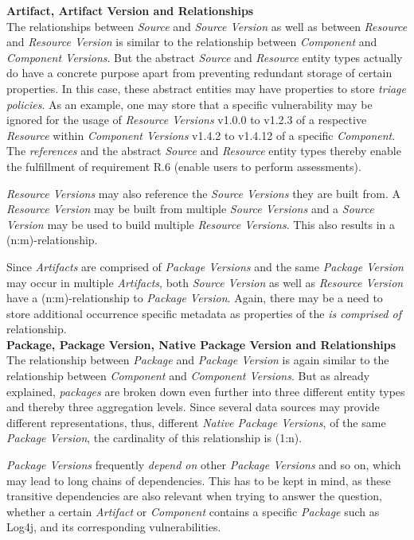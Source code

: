 \noindent\textbf{Artifact, Artifact Version and Relationships}\\
The relationships between \emph{Source} and \emph{Source Version} as well as between \emph{Resource} and \emph{Resource Version} is similar to the relationship between \emph{Component} and \emph{Component Versions}. But the abstract \emph{Source} and \emph{Resource} entity types actually do have a concrete purpose apart from preventing redundant storage of certain properties. In this case, these abstract entities may have properties to store \emph{triage policies}. As an example, one may store that a specific vulnerability may be ignored for the usage of \emph{Resource Versions} v1.0.0 to v1.2.3 of a respective \emph{Resource} within \emph{Component Versions} v1.4.2 to v1.4.12 of a specific \emph{Component}. The \emph{references} and the abstract \emph{Source} and \emph{Resource} entity types thereby enable the fulfillment of requirement R.6 (enable users to perform assessments).\par 
\emph{Resource Versions} may also reference the \emph{Source Versions} they are built from. A \emph{Resource Version} may be built from multiple \emph{Source Versions} and a \emph{Source Version} may be used to build multiple \emph{Resource Versions}. This also results in a (n:m)-relationship.\par
Since \emph{Artifacts} are comprised of \emph{Package Versions} and the same \emph{Package Version} may occur in multiple \emph{Artifacts}, both \emph{Source Version} as well as \emph{Resource Version} have a (n:m)-relationship to \emph{Package Version}. Again, there may be a need to store additional occurrence specific metadata as properties of the \emph{is comprised of} relationship.\\

\noindent\textbf{Package, Package Version, Native Package Version and Relationships}\\
The relationship between \emph{Package} and \emph{Package Version} is again similar to the relationship between \emph{Component} and \emph{Component Versions}. But as already explained, \emph{packages} are broken down even further into three different entity types and thereby three aggregation levels. Since several data sources may provide different representations, thus, different \emph{Native Package Versions}, of the same \emph{Package Version}, the cardinality of this relationship is (1:n).\par
\emph{Package Versions} frequently \emph{depend on} other \emph{Package Versions} and so on, which may lead to long chains of dependencies. This has to be kept in mind, as these transitive dependencies are also relevant when trying to answer the question, whether a certain \emph{Artifact} or \emph{Component} contains a specific \emph{Package} such as Log4j, and its corresponding vulnerabilities.\\

